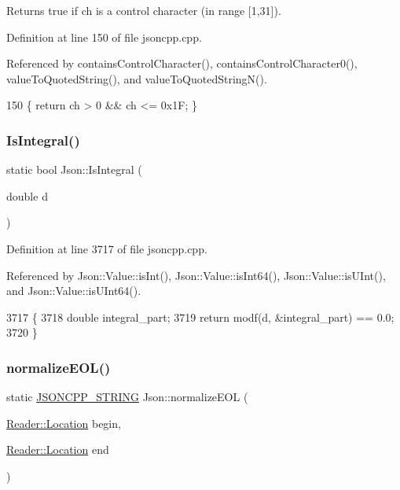 Returns true if ch is a control character (in range \mbox{[}1,31\mbox{]}). 



Definition at line 150 of file jsoncpp.\+cpp.



Referenced by contains\+Control\+Character(), contains\+Control\+Character0(), value\+To\+Quoted\+String(), and value\+To\+Quoted\+String\+N().


\begin{DoxyCode}
150 \{ \textcolor{keywordflow}{return} ch > 0 && ch <= 0x1F; \}
\end{DoxyCode}
\mbox{\label{namespace_json_a1a04cc9d31e64b5912dade003c9b99b5}} 
\subsubsection{\texorpdfstring{Is\+Integral()}{IsIntegral()}}
{\footnotesize\ttfamily static bool Json\+::\+Is\+Integral (\begin{DoxyParamCaption}\item[{double}]{d }\end{DoxyParamCaption})\hspace{0.3cm}{\ttfamily [static]}}



Definition at line 3717 of file jsoncpp.\+cpp.



Referenced by Json\+::\+Value\+::is\+Int(), Json\+::\+Value\+::is\+Int64(), Json\+::\+Value\+::is\+U\+Int(), and Json\+::\+Value\+::is\+U\+Int64().


\begin{DoxyCode}
3717                                  \{
3718   \textcolor{keywordtype}{double} integral\_part;
3719   \textcolor{keywordflow}{return} modf(d, &integral\_part) == 0.0;
3720 \}
\end{DoxyCode}
\mbox{\label{namespace_json_a63123f3dd63f340ac517a59f44ea7aa4}} 
\subsubsection{\texorpdfstring{normalize\+E\+O\+L()}{normalizeEOL()}}
{\footnotesize\ttfamily static \hyperlink{json_8h_a1e723f95759de062585bc4a8fd3fa4be}{J\+S\+O\+N\+C\+P\+P\+\_\+\+S\+T\+R\+I\+NG} Json\+::normalize\+E\+OL (\begin{DoxyParamCaption}\item[{\hyperlink{class_json_1_1_reader_a46795b5b272bf79a7730e406cb96375a}{Reader\+::\+Location}}]{begin,  }\item[{\hyperlink{class_json_1_1_reader_a46795b5b272bf79a7730e406cb96375a}{Reader\+::\+Location}}]{end }\end{DoxyParamCaption})\hspace{0.3cm}{\ttfamily [static]}}



